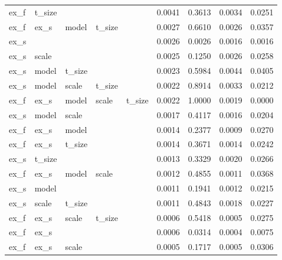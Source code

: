 \begin{table}
\begin{tabular}{lllllrrrr}
   ex\_f &  t\_size &         &         &         &                0.0041 &           0.3613 &         0.0034 &    0.0251 \\
   ex\_f &    ex\_s &   model &  t\_size &         &                0.0027 &           0.6610 &         0.0026 &    0.0357 \\
   ex\_s &         &         &         &         &                0.0026 &           0.0026 &         0.0016 &    0.0016 \\
   ex\_s &   scale &         &         &         &                0.0025 &           0.1250 &         0.0026 &    0.0258 \\
   ex\_s &   model &  t\_size &         &         &                0.0023 &           0.5984 &         0.0044 &    0.0405 \\
   ex\_s &   model &   scale &  t\_size &         &                0.0022 &           0.8914 &         0.0033 &    0.0212 \\
   ex\_f &    ex\_s &   model &   scale &  t\_size &                0.0022 &           1.0000 &         0.0019 &    0.0000 \\
   ex\_s &   model &   scale &         &         &                0.0017 &           0.4117 &         0.0016 &    0.0204 \\
   ex\_f &    ex\_s &   model &         &         &                0.0014 &           0.2377 &         0.0009 &    0.0270 \\
   ex\_f &    ex\_s &  t\_size &         &         &                0.0014 &           0.3671 &         0.0014 &    0.0242 \\
   ex\_s &  t\_size &         &         &         &                0.0013 &           0.3329 &         0.0020 &    0.0266 \\
   ex\_f &    ex\_s &   model &   scale &         &                0.0012 &           0.4855 &         0.0011 &    0.0368 \\
   ex\_s &   model &         &         &         &                0.0011 &           0.1941 &         0.0012 &    0.0215 \\
   ex\_s &   scale &  t\_size &         &         &                0.0011 &           0.4843 &         0.0018 &    0.0227 \\
   ex\_f &    ex\_s &   scale &  t\_size &         &                0.0006 &           0.5418 &         0.0005 &    0.0275 \\
   ex\_f &    ex\_s &         &         &         &                0.0006 &           0.0314 &         0.0004 &    0.0075 \\
   ex\_f &    ex\_s &   scale &         &         &                0.0005 &           0.1717 &         0.0005 &    0.0306 \\
\bottomrule
\end{tabular}
\end{table}
